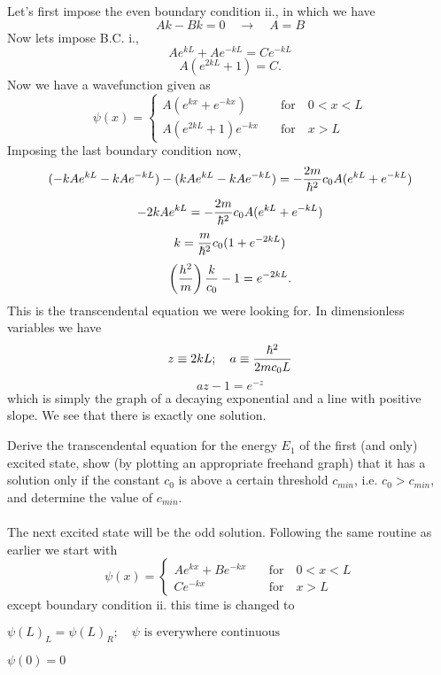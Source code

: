 \documentclass[11pt,letterpaper]{article}
\begin{document}
			Let's first impose the even boundary condition ii., in which we have
			\[
				Ak-Bk=0\quad\to\quad A=B
			\]	
			Now lets impose B.C. i., 
			\[
				Ae^{kL}+Ae^{-kL} = Ce^{-kL}
			\]		
			\[
				A(e^{2kL} +1) = C.
			\]
			Now we have a wavefunction given as 
			\[
				\psi(x) = \begin{cases} A(e^{kx}+e^{-kx})&\quad\text{for}\quad 0<x<L\\ A(e^{2kL}+1)e^{-kx} &\quad\text{for}\quad x>L 
				\end{cases}
			\]
			Imposing the last boundary condition now,
			\[
				(-kAe^{kL}-kAe^{-kL})-(kAe^{kL}-kAe^{-kL}) = -\frac{2m}{\hbar^2}c_0A(e^{kL}+e^{-kL})
			\]
			\[
				-2kAe^{kL} = -\frac{2m}{\hbar^2}c_0A(e^{kL}+e^{-kL})
			\]
			\[
				k=\frac{m}{\hbar^2}c_0(1+e^{-2kL})
			\]
			\[
				\left(\frac{h^2}{m}\right)\frac{k}{c_0}-1=e^{-2kL}.
			\]
			This is the transcendental equation we were looking for. In dimensionless variables we have
			\[
				z\equiv 2kL;\quad a\equiv \frac{\hbar^2}{2mc_0L}
			\]
			\[
				az-1=e^{-z}
			\]
			which is simply the graph of a decaying exponential and a line with positive slope. We see that there is exactly one solution. 
			\\
			\item
			Derive the transcendental equation for the energy $E_1$ of the first (and only) excited state, show (by plotting an appropriate 
			freehand graph) that it has a solution only if the constant $c_0$ is above a certain threshold $c_{min}$, i.e. $c_0 > c_{min}$,
			and determine the value of $c_{min}$.
			\\
			\\
			The next excited state will be the odd solution. Following the same routine as earlier we start with 
			\[
				\psi(x) = \begin{cases} Ae^{kx}+Be^{-kx}&\quad\text{for}\quad 0<x<L\\ Ce^{-kx} &\quad\text{for}\quad x>L 
				\end{cases}
			\]
			except boundary condition ii. this time is changed to 
			\benum
				\item
				$\psi(L)_L = \psi(L)_R; \quad \psi \text{ is everywhere continuous}$
				
				\item 
				$ \psi(0) = 0$
				
\end{document}
